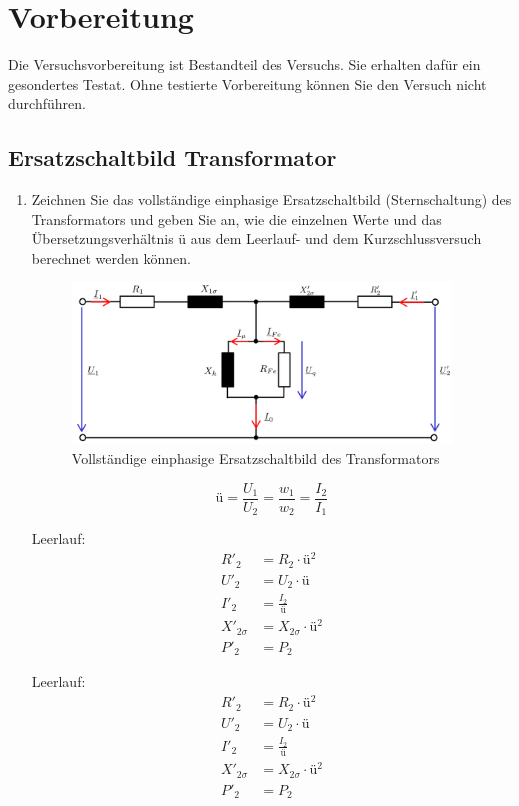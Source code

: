 \section{Vorbereitung}
 {Die Versuchsvorbereitung ist Bestandteil des Versuchs. Sie erhalten dafür ein gesondertes Testat.
  Ohne testierte Vorbereitung können Sie den Versuch nicht durchführen.}
\subsection{Ersatzschaltbild Transformator}
\begin{enumerate}[label=\alph*)]
  \item Zeichnen Sie das vollständige einphasige Ersatzschaltbild (Sternschaltung) des Transformators und geben Sie an, wie die einzelnen Werte und das Übersetzungsverhältnis ü aus dem Leerlauf- und dem Kurzschlussversuch berechnet werden können. 
    \begin{figure}[h!]
      \begin{center}
        \includegraphics[width=0.95\textwidth]{img/2.1.1.1}
      \end{center}
      \caption{Vollständige einphasige Ersatzschaltbild des Transformators}\label{img:2.1.1.1}
    \end{figure}
    $$ü=\frac{U_1}{U_2}=\frac{w_1}{w_2}=\frac{I_2}{I_1}$$
    \begin{minipage}{0.5\textwidth}
      Leerlauf:
      \begin{align*}
        R'_2&=R_2\cdot ü^2\\ 
        U'_2&=U_2\cdot ü\\ 
        I'_2 &= \frac{I_2}{ü}\\ 
        X'_{2\sigma} &= X_{2\sigma} \cdot ü^2\\ 
        P'_2 &= P_2
      \end{align*}
    \end{minipage}\hfill
    \begin{minipage}{0.5\textwidth}
      Leerlauf:
      \begin{align*}
        R'_2&=R_2\cdot ü^2\\ 
        U'_2&=U_2\cdot ü\\ 
        I'_2 &= \frac{I_2}{ü}\\ 
        X'_{2\sigma} &= X_{2\sigma} \cdot ü^2\\ 
        P'_2 &= P_2
      \end{align*}
    \end{minipage}


\end{enumerate}
